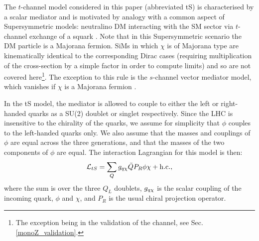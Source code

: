 
The $t$-channel model considered in this paper (abbreviated tS) is characterised by a scalar mediator and is motivated by analogy with a common aspect of Supersymmetric models: neutralino DM interacting with the SM sector via $t$-channel exchange of a squark \cite{SUSYDM}. Note that in this Supersymmetric scenario the DM particle is a Majorana fermion. SiMs in which $\chi$ is of Majorana type are kinematically identical to the corresponding Dirac cases (requiring multiplication of the cross-section by a simple factor in order to compute limits) and so are not covered here\footnote{The exception being in the validation of the \monoZ channel, see Sec. \ref{monoZ_validation}.}. The exception to this rule is the $s$-channel vector mediator model, which vanishes if $\chi$ is a Majorana fermion \cite{METSig}.

In the tS model, the mediator is allowed to couple to either the left or right-handed quarks as a SU(2) doublet or singlet respectively. Since the LHC is insensitive to the chirality of the quarks, we assume for simplicity that $\phi$ couples to the left-handed quarks only. We also assume that the masses and couplings of $\phi$ are equal across the three generations, and that the masses of the two components of $\phi$ are equal. The interaction Lagrangian for this model is then:
\begin{equation}
\label{L_int_tS}
\mathcal{L}_{tS} = \sum_{Q} g_{q \chi} \bar{Q} P_R \phi \chi + {\rm h.c.},
\end{equation}
where the sum is over the three $Q_L$ doublets, $g_{q \chi}$ is the scalar coupling of the incoming quark, $\phi$ and $\chi$, and $P_R$ is the usual chiral projection operator.


